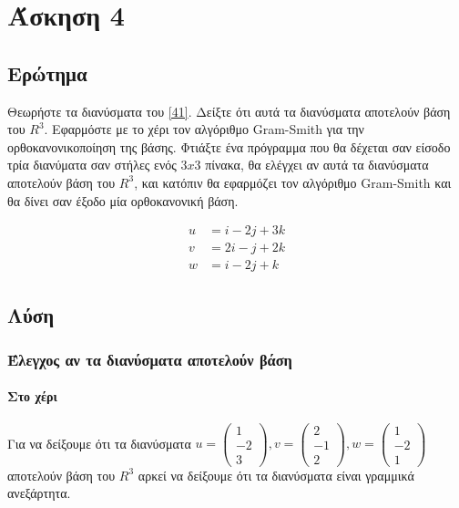 \documentclass[12pt, fleqn, leqno]{extreport}
\begin{document}
\chapter{Άσκηση 4}
\section{Ερώτημα}

Θεωρήστε τα διανύσματα του \eqref{41}. Δείξτε ότι αυτά τα διανύσματα αποτελούν βάση του $R^{3}$. Εφαρμόστε με το χέρι τον αλγόριθμο Gram-Smith για την ορθοκανονικοποίηση της βάσης. Φτιάξτε ένα πρόγραμμα που θα δέχεται σαν είσοδο τρία διανύματα σαν στήλες ενός $3x3$ πίνακα, θα ελέγχει αν αυτά τα διανύσματα αποτελούν βάση του $R^{3}$, και κατόπιν θα εφαρμόζει τον αλγόριθμο Gram-Smith και θα δίνει σαν έξοδο μία ορθοκανονική βάση.

\begin{equation}
    \begin{aligned}
        u & = i - 2j + 3k \\
        v & = 2i - j + 2k \\
        w & = i - 2j + k
    \end{aligned}\label{41}
\end{equation}

\newpage
\section{Λύση}
\subsection{Έλεγχος αν τα διανύσματα αποτελούν βάση}
\subsubsection{Στο χέρι}

Για να δείξουμε ότι τα διανύσματα
$
    u = \begin{pmatrix}
        1 \\ -2 \\ 3
    \end{pmatrix},
    v = \begin{pmatrix}
        2 \\ -1 \\ 2
    \end{pmatrix},
    w = \begin{pmatrix}
        1 \\ -2 \\ 1
    \end{pmatrix}
$
αποτελούν βάση του $R^{3}$ αρκεί να δείξουμε ότι τα διανύσματα είναι γραμμικά ανεξάρτητα.
\end{document}
